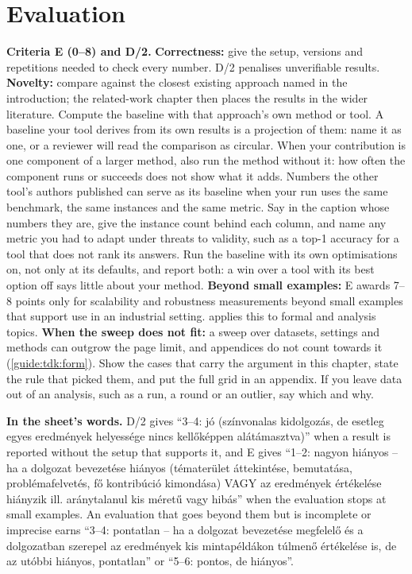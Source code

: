 \section{Evaluation}\label{guide:chapters:evaluation}
\textbf{Criteria E (0--8) and D/2.}
\textbf{Correctness:} give the setup, versions and repetitions needed to check every number. D/2 penalises unverifiable results.
\textbf{Novelty:} compare against the closest existing approach named in the introduction; the related-work chapter then places the results in the wider literature. Compute the baseline with that approach's own method or tool. A baseline your tool derives from its own results is a projection of them: name it as one, or a reviewer will read the comparison as circular. When your contribution is one component of a larger method, also run the method without it: how often the component runs or succeeds does not show what it adds. Numbers the other tool's authors published can serve as its baseline when your run uses the same benchmark, the same instances and the same metric. Say in the caption whose numbers they are, give the instance count behind each column, and name any metric you had to adapt under threats to validity, such as a top-1 accuracy for a tool that does not rank its answers. Run the baseline with its own optimisations on, not only at its defaults, and report both: a win over a tool with its best option off says little about your method.
\textbf{Beyond small examples:} E awards 7--8 points only for scalability and robustness measurements beyond small examples that support use in an industrial setting.  applies this to formal and analysis topics.
\textbf{When the sweep does not fit:} a sweep over datasets, settings and methods can outgrow the page limit, and appendices do not count towards it (\cref{guide:tdk:form}). Show the cases that carry the argument in this chapter, state the rule that picked them, and put the full grid in an appendix. If you leave data out of an analysis, such as a run, a round or an outlier, say which and why.

\textbf{In the sheet's words.} D/2 gives \enquote{3--4: jó (színvonalas kidolgozás, de esetleg egyes eredmények helyessége nincs kellőképpen alátámasztva)} when a result is reported without the setup that supports it, and E gives \enquote{1--2: nagyon hiányos -- ha a dolgozat bevezetése hiányos (tématerület áttekintése, bemutatása, problémafelvetés, fő kontribúció kimondása) VAGY az eredmények értékelése hiányzik ill. aránytalanul kis méretű vagy hibás} when the evaluation stops at small examples. An evaluation that goes beyond them but is incomplete or imprecise earns \enquote{3--4: pontatlan -- ha a dolgozat bevezetése megfelelő és a dolgozatban szerepel az eredmények kis mintapéldákon túlmenő értékelése is, de az utóbbi hiányos, pontatlan} or \enquote{5--6: pontos, de hiányos}.

